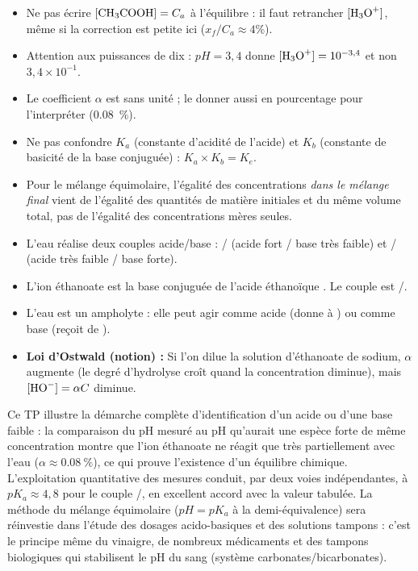 \documentclass[11pt]{article}
\newcommand{\cle}[1]{{\popxbold\color{popdark}#1}}
\newcounter{popsec}
\newcounter{popsub}
\newcommand{\courssub}[1]{%
  \stepcounter{popsub}%
  \par\vspace{9pt}\noindent{\popxbold\fontsize{11.5}{13}\selectfont\color{popink}{\color{poporange}\thepopsec.\thepopsub}\hspace{6pt}#1}\par\nopagebreak\vspace{4pt}
}
\begin{document}
\begin{attention}
\begin{itemize}
\item Ne pas écrire $[\ce{CH3COOH}] = C_a$ à l'équilibre : il faut retrancher $[\ce{H3O+}]$, même si la correction est petite ici ($x_f/C_a \approx 4\%$).
\item Attention aux puissances de dix : $pH = 3,4$ donne $[\ce{H3O+}] = 10^{-3,4}$ et non $3,4 \times 10^{-1}$.
\item Le coefficient $\alpha$ est sans unité ; le donner aussi en pourcentage pour l'interpréter (\SI{0,08}{\percent}).
\item Ne pas confondre $K_a$ (constante d'acidité de l'acide) et $K_b$ (constante de basicité de la base conjuguée) : $K_a \times K_b = K_e$.
\item Pour le mélange équimolaire, l'égalité des concentrations \emph{dans le mélange final} vient de l'égalité des quantités de matière initiales et du même volume total, pas de l'égalité des concentrations mères seules.
\end{itemize}
\end{attention}

\begin{aretenir}
\begin{itemize}
\item L'eau réalise deux couples acide/base : / (acide fort / base très faible) et / (acide très faible / base forte).
\item L'ion éthanoate  est la base conjuguée de l'acide éthanoïque . Le couple est /.
\item L'eau est un \cle{ampholyte} : elle peut agir comme acide (donne  à ) ou comme base (reçoit  de ).
\item \textbf{Loi d'Ostwald (notion) :} Si l'on dilue la solution d'éthanoate de sodium, $\alpha$ augmente (le degré d'hydrolyse croît quand la concentration diminue), mais $[\ce{HO-}] = \alpha C$ diminue.
\end{itemize}
\end{aretenir}

\courssub{Conclusion}

Ce TP illustre la démarche complète d'identification d'un acide ou d'une base faible : la comparaison du pH mesuré au pH qu'aurait une espèce forte de même concentration montre que l'ion éthanoate ne réagit que très partiellement avec l'eau ($\alpha \approx \SI{0,08}{\percent}$), ce qui prouve l'existence d'un \cle{équilibre chimique}. L'exploitation quantitative des mesures conduit, par deux voies indépendantes, à $pK_a \approx 4,8$ pour le couple /, en excellent accord avec la valeur tabulée. La méthode du mélange équimolaire ($pH = pK_a$ à la demi-équivalence) sera réinvestie dans l'étude des dosages acido-basiques et des solutions tampons : c'est le principe même du vinaigre, de nombreux médicaments et des tampons biologiques qui stabilisent le pH du sang (système carbonates/bicarbonates).
\end{document}
